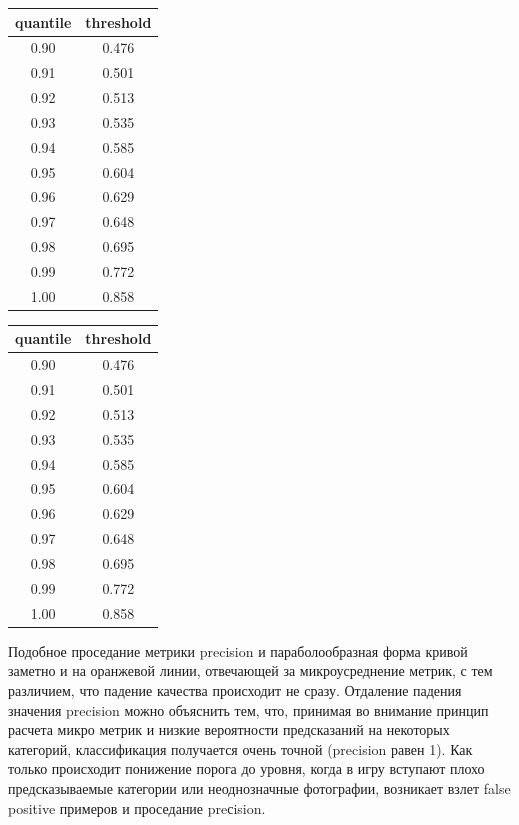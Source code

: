 \documentclass[a4paper,12pt]{extarticle}
\begin{document}
\begin{table}[ht]
	\footnotesize
	\begin{minipage}[t]{0.5\textwidth}
	\centering
	\begin{tabular}{cc}
		\toprule
		\multicolumn{1}{c}{quantile} & \multicolumn{1}{c}{threshold}\\
		\midrule
		0.90 & 0.476\\
		0.91 & 0.501\\
		0.92 & 0.513\\
		0.93 & 0.535\\
		0.94 & 0.585\\
		0.95 & 0.604\\
		0.96 & 0.629\\
		0.97 & 0.648\\
		0.98 & 0.695\\
		0.99 & 0.772\\
		1.00 & 0.858\\
		\bottomrule
	\end{tabular}
	\label{table:quantile_shoes}
	\end{minipage}
	\begin{minipage}[t]{0.5\textwidth}
	\centering
	\begin{tabular}{cc}
		\toprule
		\multicolumn{1}{c}{quantile} & \multicolumn{1}{c}{threshold}\\
		\midrule
		0.90 & 0.476\\
		0.91 & 0.501\\
		0.92 & 0.513\\
		0.93 & 0.535\\
		0.94 & 0.585\\
		0.95 & 0.604\\
		0.96 & 0.629\\
		0.97 & 0.648\\
		0.98 & 0.695\\
		0.99 & 0.772\\
		1.00 & 0.858\\
		\bottomrule
	\end{tabular}
	\label{table:quantile_shoescat2}
	\end{minipage}
\end{table}

Подобное проседание метрики precision и параболообразная форма кривой заметно и на оранжевой линии, отвечающей за микроусреднение метрик, с тем различием, что падение качества происходит не сразу. Отдаление падения значения precision можно объяснить тем, что, принимая во внимание принцип расчета микро метрик и низкие вероятности предсказаний на некоторых категорий, классификация получается очень точной (precision равен 1). Как только происходит понижение порога до уровня, когда в игру вступают плохо предсказываемые категории или неоднозначные фотографии, возникает взлет false positive примеров и проседание preсision.
\end{document}
